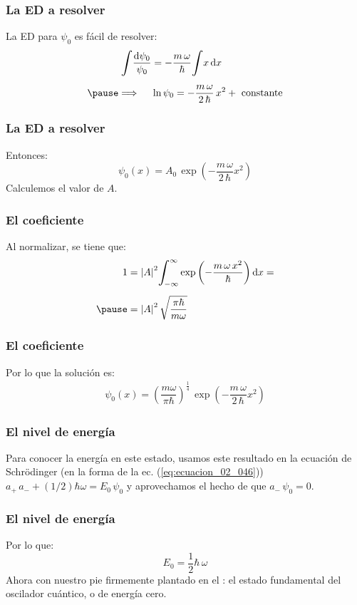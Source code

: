\documentclass[12pt]{beamer}
\begin{document}
\begin{frame}
\frametitle{La ED a resolver}
La ED para $\psi_{0}$ es fácil de resolver:
\pause
\begin{eqnarray*}
\begin{aligned}
\scaleint{6ex} \dfrac{\dd{\psi_{0}}}{\psi_{0}} &= - \dfrac{m \, \omega}{\hbar} \scaleint{6ex} x \dd{x} \\[0.5em] \pause
\Longrightarrow \hspace{0.5cm} &\ln \psi_{0} = - \dfrac{m \, \omega}{2 \, \hbar} \, x^{2} + \text{ constante}
\end{aligned}
\end{eqnarray*}
\end{frame}
\begin{frame}
\frametitle{La ED a resolver}
Entonces:
\pause
\begin{equation}
\psi_{0} (x) = A_{0} \, \exp \left( - \dfrac{m \, \omega}{2 \, \hbar} x^{2} \right)
\label{eq:ecuacion_02_048}
\end{equation}
\pause
Calculemos el valor de $A$.
\end{frame}
\begin{frame}
\frametitle{El coeficiente}
Al normalizar, se tiene que:
\begin{eqnarray*}
\begin{aligned}
1 &= \abs{A}^{2} \scaleint{6ex}_{\bs - \infty}^{\infty} \exp \left( - \dfrac{m \, \omega \, x^{2}}{\hbar} \right) \dd{x} = \\[0.5em] \pause
&= \abs{A}^{2} \, \sqrt{\dfrac{\pi \hbar}{m \omega}}
\end{aligned}
\end{eqnarray*}
\end{frame}
\begin{frame}
\frametitle{El coeficiente}
Por lo que la solución es:
\pause
\begin{align*}
\psi_{0} (x) = \left( \dfrac{m \omega}{\pi \hbar} \right)^{\frac{1}{4}} \, \exp \left( - \dfrac{m \, \omega}{2 \, \hbar} x^{2} \right)
\end{align*}
\end{frame}
\begin{frame}
\frametitle{El nivel de energía}
Para conocer la energía en este estado, usamos este resultado en la ecuación de Schrödinger (en la forma de la ec. (\ref{eq:ecuacion_02_046})) $a_{+} \, a_{-} + (1/2) \hbar \omega = E_{0} \, \psi_{0}$ y aprovechamos el hecho de que $a_{-} \, \psi_{0} = 0$.
\end{frame}
\begin{frame}
\frametitle{El nivel de energía}
Por lo que:
\pause
\begin{equation}
E_{0} = \dfrac{1}{2} \hbar \, \omega
\label{eq:ecuacion_02_049}
\end{equation}
\pause
Ahora con nuestro pie firmemente plantado en el : \pause el estado fundamental del oscilador cuántico, o de energía cero.
\end{frame}
\end{document}
